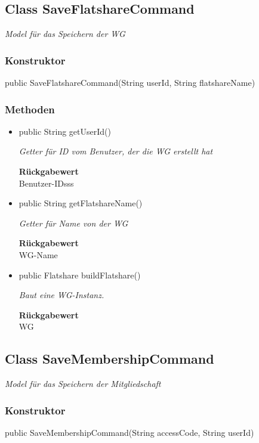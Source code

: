 \documentclass[a4paper]{scrreprt}
\begin{document}
    \subsection{Class SaveFlatshareCommand}
    \textit{Model für das Speichern der WG}
    \subsubsection{Konstruktor}
    public SaveFlatshareCommand(String userId, String flatshareName)
    \subsubsection{Methoden}
    \begin{itemize}
    	\item{public String getUserId()}
    	
    	\textit{Getter für ID vom Benutzer, der die WG erstellt hat}
    	
    	
    	
    	\textbf{Rückgabewert} \\
    	Benutzer-IDsss        \item{public String getFlatshareName()}
    	
    	\textit{Getter für Name von der WG}
    	
    	
    	
    	\textbf{Rückgabewert} \\
    	WG-Name        \item{public Flatshare buildFlatshare()}
    	
    	\textit{Baut eine WG-Instanz.}
    	
    	
    	
    	\textbf{Rückgabewert} \\
    	WG
    \end{itemize}
    \subsection{Class SaveMembershipCommand}
    \textit{Model für das Speichern der Mitgliedschaft}
    \subsubsection{Konstruktor}
    public SaveMembershipCommand(String accessCode, String userId)
\end{document}
